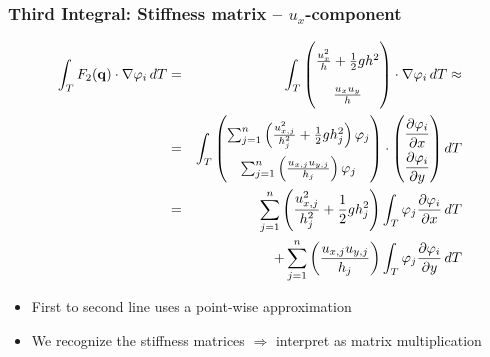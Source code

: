\documentclass{beamer}
\newcommand{\pd}[2]{\dfrac{\partial #1}{\partial #2}}
\renewcommand{\phi}{\varphi}
\begin{document}
\begin{frame}
  \frametitle{Third Integral: Stiffness matrix -- $u_x$-component}
  \begin{eqnarray*}
    \label{sec:third-integral-second-line-1}
    \int_T F_2(\mathbf{q}) \cdot \nabla \phi_i \, dT &=&
    \int_T
    \begin{pmatrix}
      \frac{u_x^2}{h} + \frac{1}{2} g h^2 \\ \frac{u_x u_y}{h}
    \end{pmatrix}
    \cdot \nabla \phi_i \, dT \approx \\        
    \label{sec:third-integral-second-line-2}
    &=& 
    \int_T 
    \begin{pmatrix}
      \sum_{j=1}^n \left(\frac{u_{x,j}^2}{h_j^2} + \frac{1}{2} g h_j^2\right) \phi_j \\
      \sum_{j=1}^n \left(\frac{u_{x,j} u_{y,j}}{h_j}\right) \phi_j \\
    \end{pmatrix}
    \cdot 
    {
      \renewcommand{\arraystretch}{2}
      \begin{pmatrix}
        \pd{\phi_i}{x} \\
        \pd{\phi_i}{y} 
      \end{pmatrix} dT 
    } \\
    &=& \nonumber \sum_{j=1}^n \left(\frac{u_{x,j}^2}{h_j^2} + \frac{1}{2} g h_j^2\right) \int_T \phi_j \pd{\phi_i}{x} \, dT \\ 
    &&+ \nonumber \sum_{j=1}^n \left(\frac{u_{x,j} u_{y,j}}{h_j}\right) \int_T \phi_j \pd{\phi_i}{y} \, dT
  \end{eqnarray*}
    \begin{itemize}
    \item First to second line uses a point-wise approximation
    \item We recognize the stiffness matrices $\Rightarrow$ interpret as matrix multiplication
    \end{itemize}
\end{frame}
\end{document}
